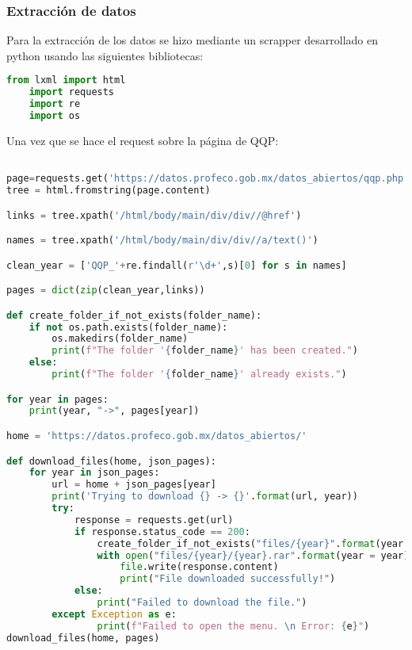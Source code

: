 \documentclass{article}
\begin{document}
\subsubsection{Extracción de datos}

Para la extracción de los datos se hizo mediante un scrapper desarrollado en python usando las siguientes bibliotecas:
\begin{lstlisting}[language=Python]
    from lxml import html
    import requests
    import re
    import os
\end{lstlisting}


Una vez que se hace el request sobre la página de QQP: 

\begin{lstlisting}[language=Python]

page=requests.get('https://datos.profeco.gob.mx/datos_abiertos/qqp.php')
tree = html.fromstring(page.content)

links = tree.xpath('/html/body/main/div/div//@href')

names = tree.xpath('/html/body/main/div/div//a/text()')

clean_year = ['QQP_'+re.findall(r'\d+',s)[0] for s in names]

pages = dict(zip(clean_year,links))

def create_folder_if_not_exists(folder_name):
    if not os.path.exists(folder_name):
        os.makedirs(folder_name)
        print(f"The folder '{folder_name}' has been created.")
    else:
        print(f"The folder '{folder_name}' already exists.")

for year in pages:
    print(year, "->", pages[year])

home = 'https://datos.profeco.gob.mx/datos_abiertos/'

def download_files(home, json_pages):
    for year in json_pages:
        url = home + json_pages[year]
        print('Trying to download {} -> {}'.format(url, year))
        try:
            response = requests.get(url)
            if response.status_code == 200:
                create_folder_if_not_exists("files/{year}".format(year = year))
                with open("files/{year}/{year}.rar".format(year = year), "wb") as file:
                    file.write(response.content)
                    print("File downloaded successfully!")
            else:
                print("Failed to download the file.")
        except Exception as e:
                print(f"Failed to open the menu. \n Error: {e}")
download_files(home, pages)
\end{lstlisting}
\end{document}
